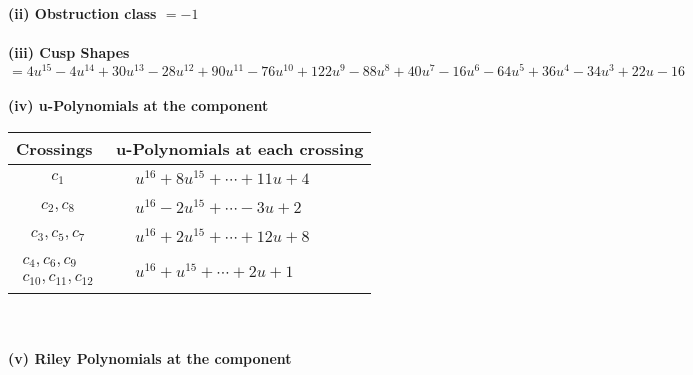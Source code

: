 \documentclass[1p]{elsarticle_modified}
\theoremstyle{definition}
\begin{document}
\flushleft \textbf{(ii) Obstruction class $= -1$}\\~\\
\flushleft \textbf{(iii) Cusp Shapes $= 4 u^{15}-4 u^{14}+30 u^{13}-28 u^{12}+90 u^{11}-76 u^{10}+122 u^9-88 u^8+40 u^7-16 u^6-64 u^5+36 u^4-34 u^3+22 u-16$}\\~\\
\newpage\renewcommand{\arraystretch}{1}
\flushleft \textbf{(iv) u-Polynomials at the component}\newline \\
\begin{tabular}{m{50pt}|m{274pt}}
Crossings & \hspace{64pt}u-Polynomials at each crossing \\
\hline $$\begin{aligned}c_{1}\end{aligned}$$&$\begin{aligned}
&u^{16}+8 u^{15}+\cdots+11 u+4
\end{aligned}$\\
\hline $$\begin{aligned}c_{2},c_{8}\end{aligned}$$&$\begin{aligned}
&u^{16}-2 u^{15}+\cdots-3 u+2
\end{aligned}$\\
\hline $$\begin{aligned}c_{3},c_{5},c_{7}\end{aligned}$$&$\begin{aligned}
&u^{16}+2 u^{15}+\cdots+12 u+8
\end{aligned}$\\
\hline $$\begin{aligned}c_{4},c_{6},c_{9}\\c_{10},c_{11},c_{12}\end{aligned}$$&$\begin{aligned}
&u^{16}+u^{15}+\cdots+2 u+1
\end{aligned}$\\
\hline
\end{tabular}\\~\\
\newpage\renewcommand{\arraystretch}{1}
\flushleft \textbf{(v) Riley Polynomials at the component}\newline \\
\end{document}

